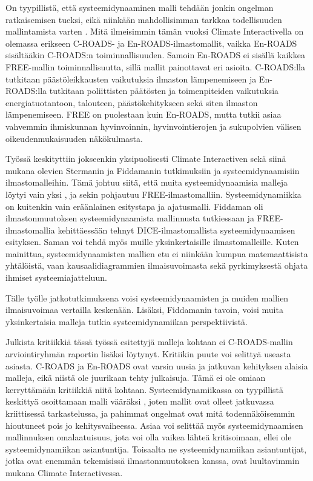 \documentclass[finnish,12pt,a4paper,pdftex]{article}
\begin{document}
\begin{onehalfspacing}
On tyypillistä, että systeemidynaaminen malli tehdään jonkin ongelman ratkaisemisen tueksi, eikä niinkään mahdollisimman tarkkaa todellisuuden mallintamista varten \cite{Sterman2000}. Mitä ilmeisimmin tämän vuoksi Climate Interactivella on olemassa erikseen C-ROADS- ja En-ROADS-ilmastomallit, vaikka En-ROADS sisältääkin C-ROADS:n toiminnallisuuden. Samoin En-ROADS ei sisällä kaikkea FREE-mallin toiminnallisuutta, sillä mallit painottavat eri asioita. C-ROADS:lla tutkitaan päästöleikkausten vaikutuksia ilmaston lämpenemiseen ja En-ROADS:lla tutkitaan poliittisten päätösten ja toimenpiteiden vaikutuksia energiatuotantoon, talouteen, päästökehitykseen sekä siten ilmaston lämpenemiseen. FREE on puolestaan kuin En-ROADS, mutta tutkii asiaa vahvemmin ihmiskunnan hyvinvoinnin, hyvinvointierojen ja sukupolvien välisen oikeudenmukaisuuden näkökulmasta. 

Työssä keskityttiin jokseenkin yksipuolisesti Climate Interactiven sekä siinä mukana olevien Stermanin ja Fiddamanin tutkimuksiin ja systeemidynaamisiin ilmastomalleihin. Tämä johtuu siitä, että muita systeemidynaamisia malleja löytyi vain yksi \cite{Evan2007}, ja sekin pohjautuu FREE-ilmastomalliin. Systeemidynamiikka on kuitenkin vain eräänlainen esitystapa ja ajatusmalli. Fiddaman oli ilmastonmuutoksen systeemidynaamista mallinnusta tutkiessaan ja FREE-ilmastomallia kehittäessään tehnyt DICE-ilmastomallista systeemidynaamisen esityksen. Saman voi tehdä myös muille yksinkertaisille ilmastomalleille. Kuten mainittua, systeemidynaamisten mallien etu ei niinkään kumpua matemaattisista yhtälöistä, vaan kausaalidiagrammien ilmaisuvoimasta sekä pyrkimyksestä ohjata ihmiset systeemiajatteluun. 

Tälle työlle jatkotutkimuksena voisi systeemidynaamisten ja muiden mallien ilmaisuvoimaa vertailla keskenään. Lisäksi, Fiddamanin tavoin, voisi muita yksinkertaisia malleja tutkia systeemidynamiikan perspektiivistä. 

Julkista kritiikkiä tässä työssä esitettyjä malleja kohtaan ei C-ROADS-mallin arviointiryhmän raportin \cite{Watson2009} lisäksi löytynyt. Kritiikin puute voi selittyä useasta asiasta. C-ROADS ja En-ROADS ovat varsin uusia ja jatkuvan kehityksen alaisia malleja, eikä niistä ole juurikaan tehty julkaisuja. Tämä ei ole omiaan kerryttämään kritiikkiä niitä kohtaan. Systeemidynamiikassa on tyypillistä keskittyä osoittamaan malli vääräksi \cite{Sterman2000}, joten mallit ovat olleet jatkuvassa kriittisessä tarkastelussa, ja pahimmat ongelmat ovat mitä todennäköisemmin hioutuneet pois jo kehitysvaiheessa. Asiaa voi selittää myös systeemidynaamisen mallinnuksen omalaatuisuus, jota voi olla vaikea lähteä kritisoimaan, ellei ole systeemidynamiikan asiantuntija. Toisaalta ne systeemidynamiikan asiantuntijat, jotka ovat enemmän tekemisissä ilmastonmuutoksen kanssa, ovat luultavimmin mukana Climate Interactivessa. 



\clearpage
{}
{}
%
%
\printbibliography

\end{onehalfspacing} %
\end{document}
